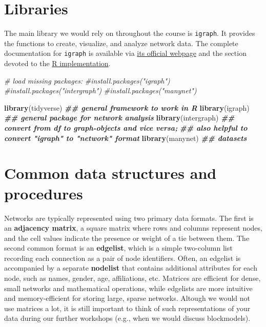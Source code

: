 \documentclass[
]{book}
\newenvironment{Shaded}{\begin{snugshade}}{\end{snugshade}}
\newcommand{\CommentTok}[1]{\textcolor[rgb]{0.56,0.35,0.01}{\textit{#1}}}
\newcommand{\DocumentationTok}[1]{\textcolor[rgb]{0.56,0.35,0.01}{\textbf{\textit{#1}}}}
\newcommand{\FunctionTok}[1]{\textcolor[rgb]{0.13,0.29,0.53}{\textbf{#1}}}
\newcommand{\NormalTok}[1]{#1}
\begin{document}
\section*{\texorpdfstring{\textbf{Libraries}}{Libraries}}\label{libraries}

The main library we would rely on throughout the course is \texttt{igraph}. It provides the functions to create, visualize, and analyze network data. The complete documentation for \texttt{igraph} is available via \href{https://igraph.org/}{its official webpage} and the section devoted to the \href{https://igraph.org/r/html/1.2.6/}{R implementation}.

\begin{Shaded}
\begin{Highlighting}[]
\CommentTok{\# load missing packages:}
\CommentTok{\#install.packages("igraph")}
\CommentTok{\#install.packages("intergraph")}
\CommentTok{\#install.packages("manynet")}

\FunctionTok{library}\NormalTok{(tidyverse)    }\DocumentationTok{\#\# general framework to work in R}
\FunctionTok{library}\NormalTok{(igraph)       }\DocumentationTok{\#\# general package for network analysis}
\FunctionTok{library}\NormalTok{(intergraph)   }\DocumentationTok{\#\# convert from df to graph{-}objects and vice versa;}
                      \DocumentationTok{\#\# also helpful to convert "igraph" to "network" format}
\FunctionTok{library}\NormalTok{(manynet)      }\DocumentationTok{\#\# datasets}
\end{Highlighting}
\end{Shaded}

\section*{\texorpdfstring{\textbf{Common data structures and procedures}}{Common data structures and procedures}}\label{common-data-structures-and-procedures}

Networks are typically represented using two primary data formats. The first is an \textbf{adjacency matrix}, a square matrix where rows and columns represent nodes, and the cell values indicate the presence or weight of a tie between them. The second common format is an \textbf{edgelist}, which is a simple two-column list recording each connection as a pair of node identifiers. Often, an edgelist is accompanied by a separate \textbf{nodelist} that contains additional attributes for each node, such as names, gender, age, affiliations, etc. Matrices are efficient for dense, small networks and mathematical operations, while edgelists are more intuitive and memory-efficient for storing large, sparse networks. Altough we would not use matrices a lot, it is still important to think of such representations of your data during our further workshops (e.g., when we would discuss blockmodels).
\end{document}
